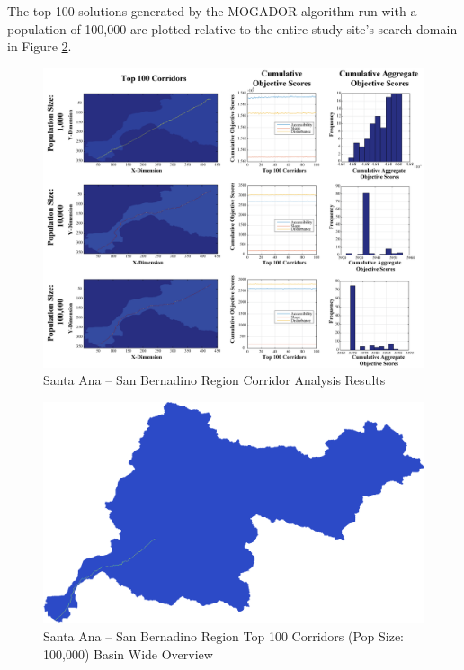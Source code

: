 The top 100 solutions generated by the MOGADOR algorithm run with a population of 100,000 are plotted relative to the entire study site's search domain in Figure \ref{fig:SASBsolutionOverview}.
    
        \begin{figure}[!h]
            \begin{center}
            \includegraphics[width=6in]{figures/SanBernadino_PathwayResults.png}   
            \caption{Santa Ana -- San Bernadino Region Corridor Analysis Results}
            \label{fig:SASBresults}
            \end{center}
        \end{figure}

        \begin{figure}[!h]
            \begin{center}
            \includegraphics[width=5.5in]{figures/SanBernadino_PathwayLarge.png}   
            \caption{Santa Ana -- San Bernadino Region Top 100 Corridors (Pop Size: 100,000) Basin Wide Overview}
            \label{fig:SASBsolutionOverview}
            \end{center}
        \end{figure}
        
